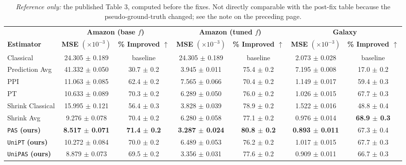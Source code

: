 \documentclass[11pt]{article}
\begin{document}
\clearpage
\begin{table}[H]
    \centering
    \caption{\emph{Reference only:} the published Table 3, computed before the fixes. Not directly comparable with the post-fix table because the pseudo-ground-truth changed; see the note on the preceding page.}
    \label{tbl:published_real}
    \vskip 0.05in
    \footnotesize
    \begin{tabular}{lcccccc}
    \toprule
    & \multicolumn{2}{c}{\textbf{Amazon (base $f$)}} & \multicolumn{2}{c}{\textbf{Amazon (tuned $f$)}} & \multicolumn{2}{c}{\textbf{Galaxy}} \\
    \cmidrule(lr){2-3} \cmidrule(lr){4-5} \cmidrule(lr){6-7}
    \textbf{Estimator} & \textbf{MSE} \( (\times 10^{-3}) \) & \textbf{\% Improved $\uparrow$} & \textbf{MSE} \( (\times 10^{-3}) \) & \textbf{\% Improved $\uparrow$} & \textbf{MSE} \( (\times 10^{-3}) \) & \textbf{\% Improved $\uparrow$} \\
    \midrule
    Classical & 24.305 $\pm$ 0.189 & baseline & 24.305 $\pm$ 0.189 & baseline & 2.073 $\pm$ 0.028 & baseline \\
    Prediction Avg & 41.332 $\pm$ 0.050 & 30.7 $\pm$ 0.2 & 3.945 $\pm$ 0.011 & 75.4 $\pm$ 0.2 & 7.195 $\pm$ 0.008 & 17.0 $\pm$ 0.2 \\
    PPI & 11.063 $\pm$ 0.085 & 62.4 $\pm$ 0.2 & 7.565 $\pm$ 0.066 & 70.4 $\pm$ 0.2 & 1.149 $\pm$ 0.017 & 59.4 $\pm$ 0.3 \\
    PT & 10.633 $\pm$ 0.089 & 70.3 $\pm$ 0.2 & 6.289 $\pm$ 0.050 & 76.0 $\pm$ 0.2 & 1.026 $\pm$ 0.015 & 67.7 $\pm$ 0.3 \\
    Shrink Classical & 15.995 $\pm$ 0.121 & 56.4 $\pm$ 0.3 & 3.828 $\pm$ 0.039 & 78.9 $\pm$ 0.2 & 1.522 $\pm$ 0.016 & 48.8 $\pm$ 0.4 \\
    Shrink Avg & 9.276 $\pm$ 0.078 & 70.4 $\pm$ 0.2 & 6.280 $\pm$ 0.058 & 77.1 $\pm$ 0.2 & 0.976 $\pm$ 0.014 & \textbf{68.9 $\pm$ 0.3} \\
    \texttt{PAS} \textbf{(ours)} & \textbf{8.517 $\pm$ 0.071} & \textbf{71.4 $\pm$ 0.2} & \textbf{3.287 $\pm$ 0.024} & \textbf{80.8 $\pm$ 0.2} & \textbf{0.893 $\pm$ 0.011} & 67.3 $\pm$ 0.4 \\
    \texttt{UniPT} \textbf{(ours)} & 10.272 $\pm$ 0.084 & 70.0 $\pm$ 0.2 & 6.489 $\pm$ 0.053 & 76.2 $\pm$ 0.2 & 1.017 $\pm$ 0.015 & 67.7 $\pm$ 0.3 \\
    \texttt{UniPAS} \textbf{(ours)} & 8.879 $\pm$ 0.073 & 69.5 $\pm$ 0.2 & 3.356 $\pm$ 0.031 & 77.6 $\pm$ 0.2 & 0.909 $\pm$ 0.011 & 66.7 $\pm$ 0.3 \\
    \bottomrule
    \end{tabular}
\end{table}
\end{document}
